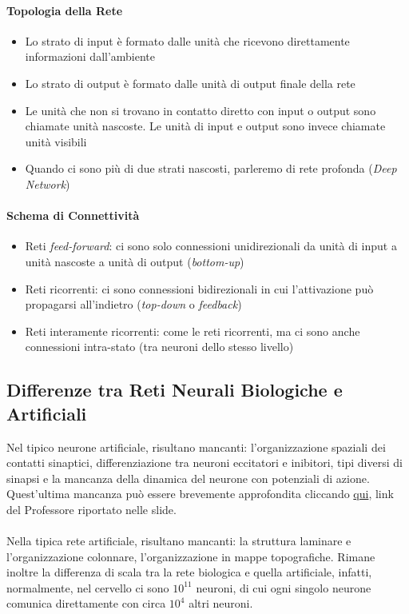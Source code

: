 \paragraph{Topologia della Rete}
\begin{itemize}
    \item Lo strato di input è formato dalle unità che ricevono direttamente informazioni dall'ambiente
    \item Lo strato di output è formato dalle unità di output finale della rete
    \item Le unità che non si trovano in contatto diretto con input o output sono chiamate unità nascoste. Le unità di input e output sono invece chiamate unità visibili
    \item Quando ci sono più di due strati nascosti, parleremo di rete profonda (\textit{Deep Network})
\end{itemize}

\paragraph{Schema di Connettività}
\begin{itemize}
    \item Reti \textit{feed-forward}: ci sono solo connessioni unidirezionali da unità di input a unità nascoste a unità di output (\textit{bottom-up})
    \item Reti ricorrenti: ci sono connessioni bidirezionali in cui l'attivazione può propagarsi all'indietro (\textit{top-down} o \textit{feedback})
    \item Reti interamente ricorrenti: come le reti ricorrenti, ma ci sono anche connessioni intra-stato (tra neuroni dello stesso livello)
\end{itemize}

\subsection{Differenze tra Reti Neurali Biologiche e Artificiali}
Nel tipico neurone artificiale, risultano mancanti: l'organizzazione spaziali dei contatti sinaptici, differenziazione tra neuroni eccitatori e inibitori, tipi diversi di sinapsi e la mancanza della dinamica del neurone con potenziali di azione.\\
Quest'ultima mancanza può essere brevemente approfondita cliccando \href{https://it.wikipedia.org/wiki/Rete_neurale_spiking}{qui}, link del Professore riportato nelle slide.\\\\
Nella tipica rete artificiale, risultano mancanti: la struttura laminare e l'organizzazione colonnare, l'organizzazione in mappe topografiche.
Rimane inoltre la differenza di scala tra la rete biologica e quella artificiale, infatti, normalmente, nel cervello ci sono \(10^{11}\) neuroni, di cui ogni singolo neurone comunica direttamente con circa \(10^{4}\) altri neuroni.
